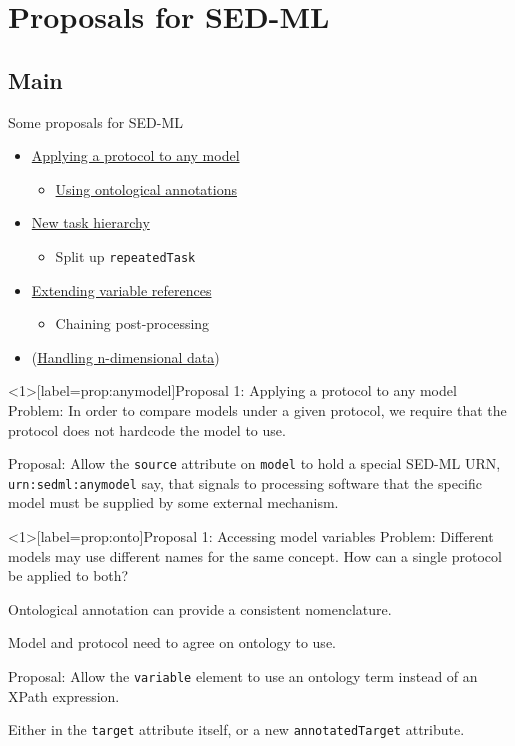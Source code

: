 \documentclass[t,xcolor={usenames,dvipsnames}]{beamer}
\newcommand{\sedml}[1]{\lstinline[basicstyle=\color{blue}]!#1!}
\newcommand{\subitem}[1]{\begin{itemize}[<.->]\item #1 \end{itemize}}
\begin{document}
\section{Proposals for SED-ML}
\subsection*{Main}

\begin{frame}{Some proposals for SED-ML}
\begin{itemize}
\item \hyperlink{prop:anymodel}{Applying a protocol to any model}
  \subitem{\hyperlink{prop:onto}{Using ontological annotations}}
\item \hyperlink{prop:tasks}{New task hierarchy}
  \subitem{Split up \sedml{repeatedTask}}
\item \hyperlink{prop:varref}{Extending variable references}
  \subitem{Chaining post-processing}
\item (\hyperlink{prop:nd}{Handling n-dimensional data})
\end{itemize}
\end{frame}


\begin{frame}<1>[label=prop:anymodel]{Proposal 1: Applying a protocol to any model}
\alert{Problem}:
 In order to compare models under a given protocol, we require that
 the protocol does not hardcode the model to use.

\alert{Proposal}:
 Allow the \sedml{source} attribute on \sedml{model} to hold a special
 SED-ML URN, \sedml{urn:sedml:anymodel} say, that signals to
 processing software that the specific model must be supplied by some
 external mechanism.
\end{frame}


\begin{frame}<1>[label=prop:onto]{Proposal 1: Accessing model variables}
\alert{Problem}:
 Different models may use different names for the same concept.  How
 can a single protocol be applied to both?

 \alert{Ontological annotation} can provide a consistent nomenclature.

 Model and protocol need to agree on ontology to use.

\alert{Proposal}:
 Allow the \sedml{variable} element to use an ontology term instead of
 an XPath expression.

 Either in the \sedml{target} attribute itself, or a new
 \sedml{annotatedTarget} attribute.
\end{frame}
\end{document}
